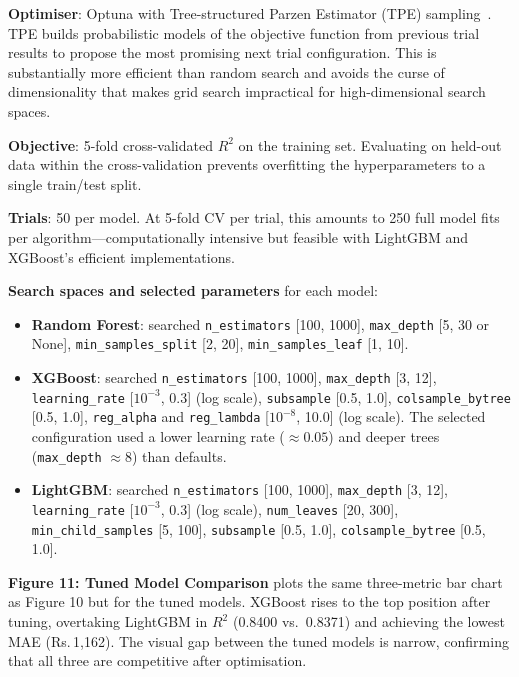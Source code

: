 \documentclass[12pt, a4paper]{article}
\begin{document}
\textbf{Optimiser}: Optuna with Tree-structured Parzen Estimator (TPE)
sampling~\cite{akiba2019}.  TPE builds probabilistic models of the
objective function from previous trial results to propose the most promising
next trial configuration.  This is substantially more efficient than random
search and avoids the curse of dimensionality that makes grid search
impractical for high-dimensional search spaces.

\textbf{Objective}: 5-fold cross-validated $R^2$ on the training set.
Evaluating on held-out data within the cross-validation prevents overfitting
the hyperparameters to a single train/test split.

\textbf{Trials}: 50 per model.  At 5-fold CV per trial, this amounts to
250 full model fits per algorithm---computationally intensive but feasible
with LightGBM and XGBoost's efficient implementations.

\textbf{Search spaces and selected parameters} for each model:

\begin{itemize}
    \item \textbf{Random Forest}: searched \texttt{n\_estimators} [100, 1000],
    \texttt{max\_depth} [5, 30 or None], \texttt{min\_samples\_split} [2, 20],
    \texttt{min\_samples\_leaf} [1, 10].

    \item \textbf{XGBoost}: searched \texttt{n\_estimators} [100, 1000],
    \texttt{max\_depth} [3, 12], \texttt{learning\_rate} [$10^{-3}$, 0.3]
    (log scale), \texttt{subsample} [0.5, 1.0], \texttt{colsample\_bytree}
    [0.5, 1.0], \texttt{reg\_alpha} and \texttt{reg\_lambda} [$10^{-8}$, 10.0]
    (log scale).  The selected configuration used a lower learning rate
    ($\approx 0.05$) and deeper trees (\texttt{max\_depth} $\approx 8$) than
    defaults.

    \item \textbf{LightGBM}: searched \texttt{n\_estimators} [100, 1000],
    \texttt{max\_depth} [3, 12], \texttt{learning\_rate} [$10^{-3}$, 0.3]
    (log scale), \texttt{num\_leaves} [20, 300], \texttt{min\_child\_samples}
    [5, 100], \texttt{subsample} [0.5, 1.0], \texttt{colsample\_bytree}
    [0.5, 1.0].
\end{itemize}

\textbf{Figure 11: Tuned Model Comparison} plots the same three-metric bar
chart as Figure 10 but for the tuned models.  XGBoost rises to the top
position after tuning, overtaking LightGBM in $R^2$ (0.8400 vs.\ 0.8371)
and achieving the lowest MAE (Rs.\,1{,}162).  The visual gap between the
tuned models is narrow, confirming that all three are competitive after
optimisation.
\end{document}
